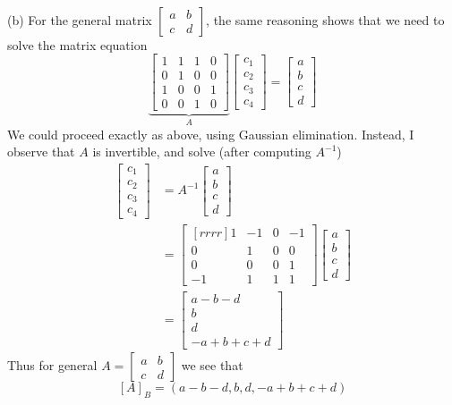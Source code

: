 \begin{solution}
\\
(b) For the general matrix $\begin{bmatrix}
a&b\\c&d
\end{bmatrix}$, the same reasoning shows that we need to solve the matrix equation 
\[
\underset{A}{\underbrace{\begin{bmatrix}
1&1&1&0\\
0&1&0&0\\
1&0&0&1\\
0&0&1&0
\end{bmatrix}}}
\begin{bmatrix}
c_1\\ c_2\\ c_3\\ c_4
\end{bmatrix}=
\begin{bmatrix}
a\\ b\\ c\\ d
\end{bmatrix}
\]
We could proceed exactly as above, using Gaussian elimination. Instead, I observe that $A$ is invertible, and solve (after computing $A^{-1}$) 
\begin{align*}
\begin{bmatrix}
c_1\\ c_2\\ c_3\\ c_4
\end{bmatrix}&=A^{-1}\begin{bmatrix}
a\\ b\\ c\\ d
\end{bmatrix}\\
&=\begin{bmatrix}[rrrr]
1& -1& 0& -1\\ 0& 1& 0& 0\\ 0& 0& 0& 1\\ -1& 1& 1& 1
\end{bmatrix}\begin{bmatrix}
a\\ b\\ c\\ d
\end{bmatrix}\\
&=\begin{bmatrix}
a - b - d\\ b\\ d \\ -a + b + c + d
\end{bmatrix}
\end{align*}
Thus for general $A=\begin{bmatrix}
a&b\\ c&d
\end{bmatrix}$ we see that 
\[
[A]_B=(a-b-d, b, d, -a+b+c+d)
\]
\end{solution}
